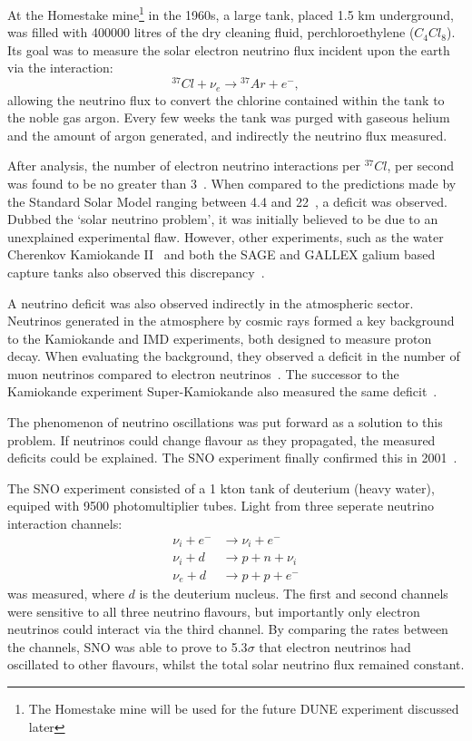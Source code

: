 At the Homestake mine\footnote{The Homestake mine will be used for the future DUNE experiment
    discussed later} in the 1960s, a large tank, placed 1.5 km underground, was filled with
400000 litres of the dry cleaning fluid, perchloroethylene ($C_{4}Cl_{8}$). Its goal was to
measure the solar electron neutrino flux incident upon the earth via the interaction:
\begin{equation} %
    {}^{37}Cl+\nu_{e}\rightarrow{}^{37}Ar+e^{-},
\end{equation} %
allowing the neutrino flux to convert the chlorine contained within the tank to the noble gas
argon. Every few weeks the tank was purged with gaseous helium and the amount of argon generated,
and indirectly the neutrino flux measured.

After analysis, the number of electron neutrino interactions per ${}^{37}Cl$, per second was found
to be no greater than 3~\cite{davis1968}. When compared to the predictions made by the Standard
Solar Model ranging between 4.4 and 22~\cite{bahcall1968}, a deficit was observed. Dubbed the
`solar neutrino problem', it was initially believed to be due to an unexplained experimental flaw.
However, other experiments, such as the water Cherenkov Kamiokande II~\cite{hirata1989} and both
the SAGE and GALLEX galium based capture tanks also observed this
discrepancy~\cite{abazov1991,anselmann1994}.

A neutrino deficit was also observed indirectly in the atmospheric sector. Neutrinos generated in
the atmosphere by cosmic rays formed a key background to the Kamiokande and IMD experiments, both
designed to measure proton decay. When evaluating the background, they observed a deficit in the
number of muon neutrinos compared to electron neutrinos~\cite{hirata1988, becker1992}. The
successor to the Kamiokande experiment Super-Kamiokande also measured the same
deficit~\cite{kajita1999}.

The phenomenon of neutrino oscillations was put forward as a solution to this problem. If
neutrinos could change flavour as they propagated, the measured deficits could be explained. The
SNO experiment finally confirmed this in 2001~\cite{ahmad2002}.

The SNO experiment consisted of a 1 kton tank of deuterium (heavy water), equiped with 9500
photomultiplier tubes. Light from three seperate neutrino interaction channels:
\begin{align} %
    \nu_{i}+e^{-} & \rightarrow \nu_{i}+e^{-} \\
    \nu_{i}+d     & \rightarrow p+n+\nu_{i}   \\
    \nu_{e}+d     & \rightarrow p+p+e^{-}
\end{align}
was measured, where $d$ is the deuterium nucleus. The first and second channels were sensitive to
all three neutrino flavours, but importantly only electron neutrinos could interact via the third
channel. By comparing the rates between the channels, SNO was able to prove to 5.3$\sigma$ that
electron neutrinos had oscillated to other flavours, whilst the total solar neutrino flux remained
constant.

